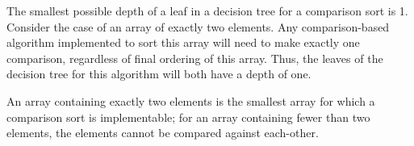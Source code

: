 The smallest possible depth of a leaf in a decision tree for a comparison sort is 1. Consider the case of an array of exactly two elements. Any comparison-based algorithm implemented to sort this array will need to make exactly one comparison, regardless of final ordering of this array. Thus, the leaves of the decision tree for this algorithm will both have a depth of one.
\par
An array containing exactly two elements is the smallest array for which a comparison sort is implementable; for an array containing fewer than two elements, the elements cannot be compared against each-other.